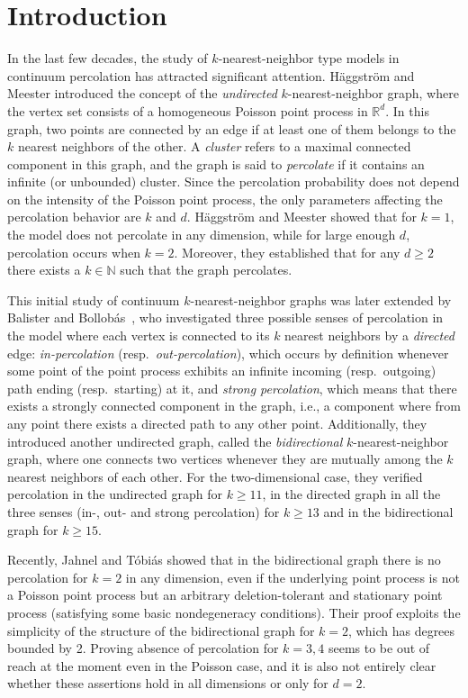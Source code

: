 \documentclass[a4paper, oneside, 11pt]{amsart}
\newcommand{\N}{\mathbb{N}}
\theoremstyle{definition}
\newcommand{\1}{\mathbbm{1}}
\newcommand{\0}{\mathbf{o}}
\numberwithin{equation}{section}
\begin{document}
\section{Introduction}
In the last few decades, the study of $k$-nearest-neighbor type models in continuum percolation has attracted significant attention. Häggström and Meester \cite{HaggMee96} introduced the concept of the \emph{undirected} $k$-nearest-neighbor graph, where the vertex set consists of a homogeneous Poisson point process in $\mathbb{R}^d$. In this graph, two points are connected by an edge if at least one of them belongs to the $k$ nearest neighbors of the other. A \emph{cluster} refers to a maximal connected component in this graph, and the graph is said to \emph{percolate} if it contains an infinite (or unbounded) cluster. Since the percolation probability does not depend on the intensity of the Poisson point process, the only parameters affecting the percolation behavior are $k$ and $d$. 
Häggström and Meester showed that for $k = 1$, the model does not percolate in any dimension, while for large enough $d$, percolation occurs when $k = 2$. Moreover, they established that for any $d \geq 2$ there exists a $k \in \N$ such that the graph percolates. 

This initial study of continuum $k$-nearest-neighbor graphs was later extended by Balister and Bollobás~\cite{BalisterBollobas13}, who investigated three possible senses of percolation in the model where each vertex is connected  to its $k$ nearest neighbors by a \emph{directed} edge: \emph{in-percolation} (resp.~\emph{out-percolation}), which occurs by definition whenever some point of the point process exhibits an infinite incoming (resp.\ outgoing) path ending (resp.\ starting) at it, and \emph{strong percolation}, which means that there exists a strongly connected component in the graph, i.e., a component where from any point there exists a directed path to any other point.
Additionally, they introduced another undirected graph, called the \emph{bidirectional} $k$-nearest-neighbor graph, where one connects two vertices whenever they are mutually among the $k$ nearest neighbors of each other. For the two-dimensional case, they verified percolation in the undirected graph for $k \geq 11$, in the directed graph in all the three senses (in-, out- and strong percolation) for $k \geq 13$ and in the bidirectional graph for $k \geq 15$.

Recently, Jahnel and T\'obi\'as \cite{JT22} showed that in the bidirectional graph there is no percolation for $k=2$ in any dimension, even if the underlying point process is not a Poisson point process but an arbitrary deletion-tolerant and stationary point process (satisfying some basic nondegeneracy conditions). Their proof exploits the simplicity of the structure of the bidirectional graph for $k=2$, which has degrees bounded by 2. Proving absence of percolation for $k=3,4$ seems to be out of reach at the moment even in the Poisson case, and it is also not entirely clear whether these assertions hold in all dimensions or only for $d=2$.
\end{document}
